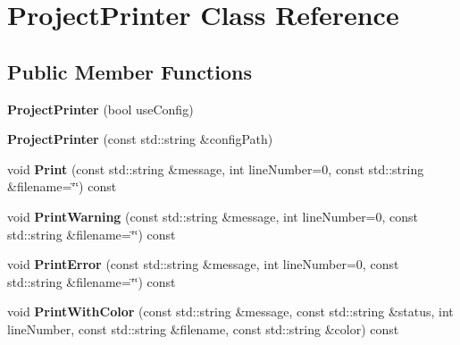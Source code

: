 \hypertarget{classProjectPrinter}{\section{Project\-Printer Class Reference}
\label{classProjectPrinter}
}
\subsection*{Public Member Functions}
\begin{DoxyCompactItemize}
\item 
\hypertarget{classProjectPrinter_aa5410f5d9121be33a2fe14d9ed9cf4dc}{{\bfseries Project\-Printer} (bool use\-Config)}\label{classProjectPrinter_aa5410f5d9121be33a2fe14d9ed9cf4dc}

\item 
\hypertarget{classProjectPrinter_af054624c27d14a3a853861b72a94ce9b}{{\bfseries Project\-Printer} (const std\-::string \&config\-Path)}\label{classProjectPrinter_af054624c27d14a3a853861b72a94ce9b}

\item 
\hypertarget{classProjectPrinter_a1af181fb5d74aba6e2b18ed385ca83fa}{void {\bfseries Print} (const std\-::string \&message, int line\-Number=0, const std\-::string \&filename=\char`\"{}\char`\"{}) const }\label{classProjectPrinter_a1af181fb5d74aba6e2b18ed385ca83fa}

\item 
\hypertarget{classProjectPrinter_ad782152949f1957121ab1efa81ffeb6e}{void {\bfseries Print\-Warning} (const std\-::string \&message, int line\-Number=0, const std\-::string \&filename=\char`\"{}\char`\"{}) const }\label{classProjectPrinter_ad782152949f1957121ab1efa81ffeb6e}

\item 
\hypertarget{classProjectPrinter_a9d551558b0aa3873aa0bc9f816595b1d}{void {\bfseries Print\-Error} (const std\-::string \&message, int line\-Number=0, const std\-::string \&filename=\char`\"{}\char`\"{}) const }\label{classProjectPrinter_a9d551558b0aa3873aa0bc9f816595b1d}

\item 
\hypertarget{classProjectPrinter_a39ad130505d38a5e280accf5e83ff6e1}{void {\bfseries Print\-With\-Color} (const std\-::string \&message, const std\-::string \&status, int line\-Number, const std\-::string \&filename, const std\-::string \&color) const }\label{classProjectPrinter_a39ad130505d38a5e280accf5e83ff6e1}


\end{DoxyCompactItemize}
